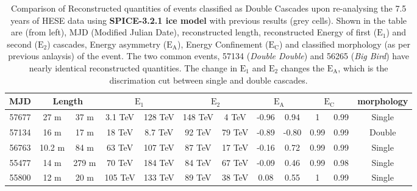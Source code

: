 \begin{table}[h!]
    \caption{Comparison of Reconstructed quantities of events classified as Double Cascades upon re-analysing the  7.5 years of HESE data using \textbf{SPICE-3.2.1 ice model} with previous results (grey cells). Shown in the table are (from left), MJD (Modified Julian Date), reconstructed length, reconstructed Energy of first ($\mathrm{E}_1$) and second ($\mathrm{E}_2$) cascades, Energy asymmetry ($\mathrm{E}_\mathrm{A}$), Energy Confinement ($\mathrm{E}_\mathrm{C}$) and classified morphology (as per previous anlaysis) of the event. The two common events, 57134 (\emph{Double Double}) and 56265 (\emph{Big Bird}) have nearly identical reconstructed quantities. The change in $\mathrm{E}_1$ and $\mathrm{E}_2$ changes the $\mathrm{E}_\mathrm{A}$, which is the discrimation cut between single and double cascades.}
    \begin{tabular}{c|cc|cc|cc|cc|cc|c}
        \toprule
         MJD    & \multicolumn{2}{c|}{Length}
                
                        & \multicolumn{2}{c|}{$\mathrm{E}_\mathrm{1}$}
                                & \multicolumn{2}{c|}{$\mathrm{E}_\mathrm{2}$} 
                                    & \multicolumn{2}{c|}{$\mathrm{E}_\mathrm{A}$} 
                                        & \multicolumn{2}{c|}{$\mathrm{E}_\mathrm{C}$}  
                                            & \multicolumn{1}{c}{morphology}                \\
                       
        \midrule
        57677   &   27 m   & \cellcolor{lightgray}37 m    & 3.1 TeV   &   \cellcolor{lightgray}128 TeV  &   148 TeV  &   \cellcolor{lightgray}4 TeV  &   -0.96  &   \cellcolor{lightgray}0.94 & 1 &  \cellcolor{lightgray}0.99& \cellcolor{lightgray}Single\\
        57134   &   16 m   & \cellcolor{lightgray}17 m    & 18 TeV   &   \cellcolor{lightgray}8.7 TeV  &   92 TeV  &   \cellcolor{lightgray}79 TeV  &   -0.89  &   \cellcolor{lightgray}-0.80 & 0.99 &  \cellcolor{lightgray}0.99& \cellcolor{lightgray}Double\\
        56763   & 10.2 m   & \cellcolor{lightgray}84 m    & 63 TeV   &   \cellcolor{lightgray}107 TeV  &    87 TeV  &   \cellcolor{lightgray}17 TeV  &   -0.16  &   \cellcolor{lightgray}0.72 & 0.99 &  \cellcolor{lightgray}0.99  & \cellcolor{lightgray}Single\\
        55477   &   14 m   & \cellcolor{lightgray}279 m    & 70 TeV   &   \cellcolor{lightgray}184 TeV  &   84 TeV  &   \cellcolor{lightgray}67 TeV  &   -0.09  &   \cellcolor{lightgray}0.46 & 0.99 &  \cellcolor{lightgray}0.98& \cellcolor{lightgray}Single\\
        55800   &   12 m   & \cellcolor{lightgray}20 m    & 105 TeV   &   \cellcolor{lightgray}133 TeV  &   89 TeV  &   \cellcolor{lightgray}38 TeV  &   0.08  &   \cellcolor{lightgray}0.55 & 1 &  \cellcolor{lightgray}0.99& \cellcolor{lightgray}Single\\


\end{tabular}
\end{table}
